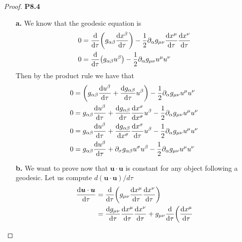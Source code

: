 \documentclass[11pt]{article}
\theoremstyle{definition}
\begin{document}
\begin{proof}{\textbf{P8.4}}
    \begin{itemize}
        \item [\textbf{a.}] We know that the geodesic equation is
        \begin{align*}
            0 &= \derivative{}{\tau}\bigg(
            g_{\alpha\beta}\derivative{x^\beta}{\tau}\bigg)
            - \frac{1}{2}\partial_\alpha g_{\mu\nu}\derivative{x^\mu}{\tau}
            \derivative{x^\nu}{\tau}\\
            0 &= \derivative{}{\tau}\big(g_{\alpha\beta}u^\beta\big)
            - \frac{1}{2}\partial_\alpha g_{\mu\nu}u^\mu u^\nu
        \end{align*}
        Then by the product rule we have that
        \begin{align*}
            0 &=
            \bigg(g_{\alpha\beta}\derivative{u^\beta}{\tau}
            + \derivative{g_{\alpha\beta}}{\tau}u^\beta\bigg) 
            - \frac{1}{2}\partial_\alpha g_{\mu\nu}u^\mu u^\nu\\
            0 &=
            g_{\alpha\beta}\derivative{u^\beta}{\tau}
            + \derivative{g_{\alpha\beta}}{\tau}
            \derivative{x^\sigma}{x^\sigma}u^\beta  
            - \frac{1}{2}\partial_\alpha g_{\mu\nu}u^\mu u^\nu\\
            0 &=
            g_{\alpha\beta}\derivative{u^\beta}{\tau}
            + \derivative{g_{\alpha\beta}}{x^\sigma}
            \derivative{x^\sigma}{\tau}u^\beta  
            - \frac{1}{2}\partial_\alpha g_{\mu\nu}u^\mu u^\nu\\
            0 &=
            g_{\alpha\beta}\derivative{u^\beta}{\tau}
            + \partial_\sigma g_{\alpha\beta}
            u^\sigma u^\beta  
            - \frac{1}{2}\partial_\alpha g_{\mu\nu}u^\mu u^\nu
        \end{align*}
        \item [\textbf{b.}] We want to prove now that $\bm{u}\cdot\bm{u}$
        is constant for any object following a geodesic.
        Let us compute $d(\bm{u}\cdot\bm{u}) /d\tau$
        \begin{align*}
            \derivative{\bm{u}\cdot\bm{u}}{\tau}
            &= \derivative{}{\tau}\bigg(
                g_{\mu\nu}\derivative{x^\mu}{\tau}\derivative{x^\nu}{\tau}
            \bigg)\\
            &=
            \derivative{g_{\mu\nu}}{\tau}\derivative{x^\mu}{\tau}
            \derivative{x^\nu}{\tau}
            + g_{\mu\nu}\derivative{}{\tau}\bigg(\derivative{x^\mu}{\tau}

\end{align*}
\end{itemize}
\end{proof}
\end{document}
